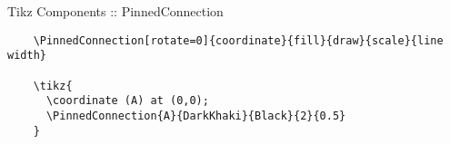\documentclass[9pt,xcolor={svgnames, x11names}]{beamer}
\begin{document}

\begin{frame}[fragile]{Tikz Components :: PinnedConnection}

  \small
  \begin{verbatim}
    \PinnedConnection[rotate=0]{coordinate}{fill}{draw}{scale}{line width}

    \tikz{
      \coordinate (A) at (0,0);
      \PinnedConnection{A}{DarkKhaki}{Black}{2}{0.5}
    }
  \end{verbatim}

  \vspace{1cm}


\end{frame}









\end{document}
